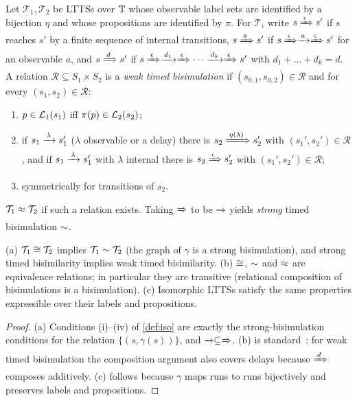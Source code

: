 \begin{definition}\label{def:wtb}
Let $\mathcal{T}_1,\mathcal{T}_2$ be LTTSs over $\mathbb{T}$ whose observable label
sets are identified by a bijection $\eta$ and whose propositions are
identified by $\pi$. For $\mathcal{T}_i$ write
$s\xRightarrow{\,\epsilon\,}s'$ if $s$ reaches $s'$ by a finite sequence of internal
transitions, $s\xRightarrow{\,a\,}s'$ if $s\xRightarrow{\,\epsilon\,}\xrightarrow{\,a\,}\xRightarrow{\,\epsilon\,}s'$
for an observable $a$, and $s\xRightarrow{\,d\,}s'$ if
$s\xRightarrow{\,\epsilon\,}\xrightarrow{\,d_1\,}\xRightarrow{\,\epsilon\,}\cdots\xrightarrow{\,d_k\,}\xRightarrow{\,\epsilon\,}s'$
with $d_1+\dots+d_k=d$. A relation $\mathcal{R}\subseteq S_1\times S_2$ is a
\emph{weak timed bisimulation} if $(s_{0,1},s_{0,2})\in\mathcal{R}$ and for
every $(s_1,s_2)\in\mathcal{R}$:
\begin{enumerate}[label=(W\arabic*)]
\item $p\in\mathcal{L}_1(s_1)$ iff $\pi(p)\in\mathcal{L}_2(s_2)$;
\item if $s_1\xrightarrow{\,\lambda\,}s_1'$ ($\lambda$ observable or a delay) there is
  $s_2\xRightarrow{\,\eta(\lambda)\,}s_2'$ with $(s_1',s_2')\in\mathcal{R}$, and if
  $s_1\xrightarrow{\,\lambda\,}s_1'$ with $\lambda$ internal there is
  $s_2\xRightarrow{\,\epsilon\,}s_2'$ with $(s_1',s_2')\in\mathcal{R}$;
\item symmetrically for transitions of $s_2$.
\end{enumerate}
$\mathcal{T}_1\approx\mathcal{T}_2$ if such a relation exists. Taking
$\xRightarrow{\,\,}$ to be $\xrightarrow{\,\,}$ yields \emph{strong} timed bisimulation $\sim$.
\end{definition}

\begin{lemma}\label{lem:facts}
(a) $\mathcal{T}_1\cong\mathcal{T}_2$ implies $\mathcal{T}_1\sim\mathcal{T}_2$
(the graph of $\gamma$ is a strong bisimulation), and strong timed bisimilarity
implies weak timed bisimilarity.
(b) $\cong$, $\sim$ and $\approx$ are equivalence relations; in particular they
are transitive (relational composition of bisimulations is a bisimulation).
(c) Isomorphic LTTSs satisfy the same properties expressible over their
labels and propositions.
\end{lemma}
\begin{proof}
(a) Conditions (i)--(iv) of \cref{def:iso} are exactly the strong-bisimulation
conditions for the relation $\{(s,\gamma(s))\}$, and $\xrightarrow{\,\,}\subseteq\xRightarrow{\,\,}$.
(b) is standard~\cite{milner}; for weak timed bisimulation the composition
argument also covers delays because $\xRightarrow{\,d\,}$ composes additively.
(c) follows because $\gamma$ maps runs to runs bijectively and preserves labels
and propositions.
\end{proof}
